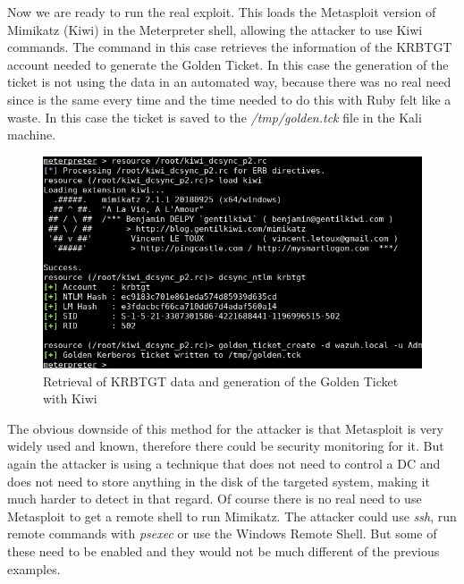 \linej
Now we are ready to run the real exploit. This loads the Metasploit version of Mimikatz (Kiwi) in the Meterpreter shell, allowing the attacker to use Kiwi commands.
The command in this case retrieves the information of the KRBTGT account needed to generate the Golden Ticket.
\linej
In this case the generation of the ticket is not using the data in an automated way, because there was no real need since is the same every time and the time needed to do this with Ruby felt like a waste. In this case the ticket is saved to the \textit{/tmp/golden.tck} file in the Kali machine.
\linej

\begin{figure}[H]
	\centering
	\includegraphics[width=\textwidth]{figuras/kiwi_p2.png}
	\caption{Retrieval of KRBTGT data and generation of the Golden Ticket with Kiwi}
\end{figure}
\linej
The obvious downside of this method for the attacker is that Metasploit is very widely used and known, therefore there could be security monitoring for it\cite{detect_metasploit_traffic}. But again the attacker is using a technique that does not need to control a DC and does not need to store anything in the disk of the targeted system, making it much harder to detect in that regard.
\linej
\linej
Of course there is no real need to use Metasploit to get a remote shell to run Mimikatz. The attacker could use \textit{ssh}, run remote commands with \textit{psexec} or use the Windows Remote Shell. But some of these need to be enabled and they would not be much different of the previous examples.

